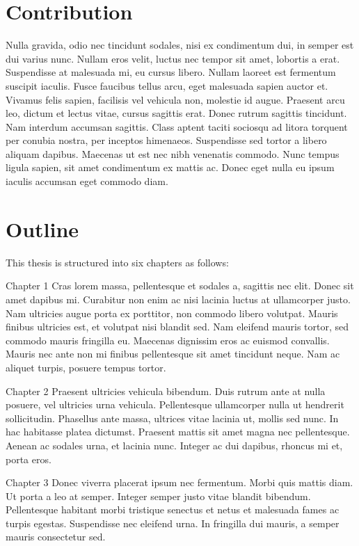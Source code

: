 \section{Contribution}

Nulla gravida, odio nec tincidunt sodales, nisi ex condimentum dui, in semper est dui varius nunc. Nullam eros velit, luctus nec tempor sit amet, lobortis a erat. Suspendisse at malesuada mi, eu cursus libero. Nullam laoreet est fermentum suscipit iaculis. Fusce faucibus tellus arcu, eget malesuada sapien auctor et. Vivamus felis sapien, facilisis vel vehicula non, molestie id augue. Praesent arcu leo, dictum et lectus vitae, cursus sagittis erat. Donec rutrum sagittis tincidunt. Nam interdum accumsan sagittis. Class aptent taciti sociosqu ad litora torquent per conubia nostra, per inceptos himenaeos. Suspendisse sed tortor a libero aliquam dapibus. Maecenas ut est nec nibh venenatis commodo. Nunc tempus ligula sapien, sit amet condimentum ex mattis ac. Donec eget nulla eu ipsum iaculis accumsan eget commodo diam.

\section{Outline}

This thesis is structured into six chapters as follows:
\bigskip

Chapter 1 Cras lorem massa, pellentesque et sodales a, sagittis nec elit. Donec sit amet dapibus mi. Curabitur non enim ac nisi lacinia luctus at ullamcorper justo. Nam ultricies augue porta ex porttitor, non commodo libero volutpat. Mauris finibus ultricies est, et volutpat nisi blandit sed. Nam eleifend mauris tortor, sed commodo mauris fringilla eu. Maecenas dignissim eros ac euismod convallis. Mauris nec ante non mi finibus pellentesque sit amet tincidunt neque. Nam ac aliquet turpis, posuere tempus tortor.
\bigskip

Chapter 2 Praesent ultricies vehicula bibendum. Duis rutrum ante at nulla posuere, vel ultricies urna vehicula. Pellentesque ullamcorper nulla ut hendrerit sollicitudin. Phasellus ante massa, ultrices vitae lacinia ut, mollis sed nunc. In hac habitasse platea dictumst. Praesent mattis sit amet magna nec pellentesque. Aenean ac sodales urna, et lacinia nunc. Integer ac dui dapibus, rhoncus mi et, porta eros.
\bigskip

Chapter 3 Donec viverra placerat ipsum nec fermentum. Morbi quis mattis diam. Ut porta a leo at semper. Integer semper justo vitae blandit bibendum. Pellentesque habitant morbi tristique senectus et netus et malesuada fames ac turpis egestas. Suspendisse nec eleifend urna. In fringilla dui mauris, a semper mauris consectetur sed.
\bigskip

